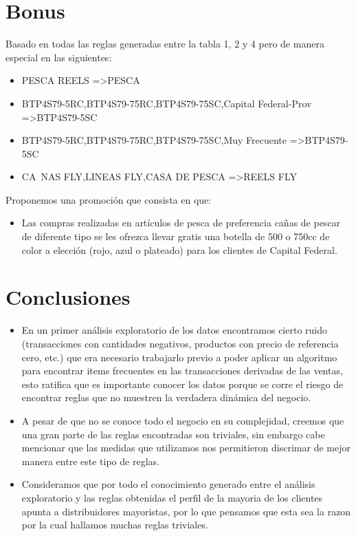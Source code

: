 \documentclass[]{article}
\begin{document}
	\section{Bonus}
	Basado en todas las reglas generadas entre la tabla 1, 2 y 4 pero de manera especial en las siguientes:\\
	\begin{itemize}
		\item PESCA REELS =\textgreater PESCA
		\item BTP4S79-5RC,BTP4S79-75RC,BTP4S79-75SC,Capital Federal-Prov =\textgreater BTP4S79-5SC
		\item BTP4S79-5RC,BTP4S79-75RC,BTP4S79-75SC,Muy Frecuente =\textgreater BTP4S79-5SC
		\item CA~NAS FLY,LINEAS FLY,CASA DE PESCA =\textgreater REELS FLY\\
	\end{itemize}
	 Proponemos una promoción que consista en que: 
	\begin{itemize}
		\item Las compras realizadas en artículos de pesca de preferencia cañas de pescar de diferente tipo se les ofrezca llevar gratis una botella de 500 o 750cc de color a elección (rojo, azul o plateado) para los clientes de Capital Federal.\\
	\end{itemize}

	\section{Conclusiones}
	\begin{itemize}
		\item En un primer análisis exploratorio de los datos encontramos cierto ruido (transacciones con cantidades negativos, productos con precio de referencia cero, etc.) que era necesario trabajarlo previo a poder aplicar un algoritmo para encontrar items frecuentes en las transacciones derivadas de las ventas, esto ratifica que es importante conocer los datos porque se corre el riesgo de encontrar reglas que no muestren la verdadera dinámica del negocio.\\
		\item A pesar de que no se conoce todo el negocio en su complejidad, creemos que una gran parte de las reglas encontradas son triviales, sin embargo cabe mencionar que las medidas que utilizamos nos permitieron discrimar de mejor manera entre este tipo de reglas.\\
		\item Consideramos que por todo el conocimiento generado entre el análisis exploratorio y las reglas obtenidas el perfil de la mayoria de los clientes apunta a distribuidores mayoristas, por lo que pensamos que esta sea la razon por la cual hallamos muchas reglas triviales.\\
	\end{itemize}
	
\end{document}
